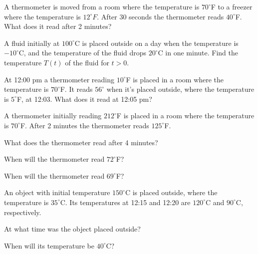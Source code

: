 \begin{exerciselist}
  \item\label{exer:4.2.1} A thermometer is moved from a room where the temperature is $70^{\circ}$F
        to a freezer where the temperature is $12^{\circ}F$. After 30 seconds the thermometer reads
        $40^{\circ}$F. What does it read after 2 minutes?

  \item\label{exer:4.2.2} A fluid initially at $100^{\circ}$C is placed outside on a day when the
        temperature is $-10^{\circ}$C, and the temperature of the fluid drops $20^{\circ}$C in one
        minute. Find the temperature $T(t)$ of the fluid for $t>0$.

  \item\label{exer:4.2.3} At 12:00 {\sc pm} a thermometer reading $10^{\circ}$F is placed in a room
        where the temperature is $70^{\circ}$F. It reads $56^{\circ}$ when it's placed outside,
        where the temperature is $5^{\circ}$F, at 12:03. What does it read at 12:05 {\sc pm}?

  \item\label{exer:4.2.4} A thermometer initially reading $212^{\circ}$F is placed in a room where
        the temperature is $70^{\circ}$F. After 2 minutes the thermometer reads $125^{\circ}$F.

  \begin{alist}
    \item %
    What does the thermometer read after 4 minutes?

    \item %
    When will the thermometer read $72^{\circ}$F?

    \item %
    When will the thermometer read $69^{\circ}$F?
  \end{alist}

  \item\label{exer:4.2.5} An object with initial temperature $150^{\circ}$C is placed outside, where
        the temperature is $35^{\circ}$C. Its temperatures at 12:15 and 12:20 are $120^{\circ}$C and
        $90^{\circ}$C, respectively.

  \begin{alist}
    \item %
    At what time was the object placed outside?

    \item %
    When will its temperature be $40^{\circ}$C?
  \end{alist}


\end{exerciselist}
